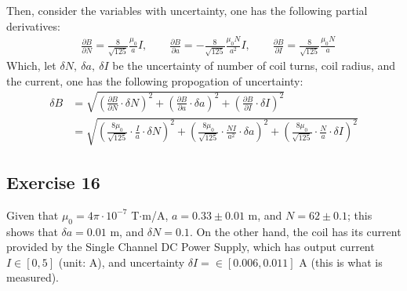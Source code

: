 \documentclass{article}
\begin{document}
Then, consider the variables with uncertainty, one has the following partial derivatives:
\begin{align}
    & \frac{\partial B}{\partial N} = \frac{8}{\sqrt{125}}\frac{\mu_0}{a}I,\quad\quad \frac{\partial B}{\partial a} = -\frac{8}{\sqrt{125}}\frac{\mu_0 N}{a^2}I,\quad\quad \frac{\partial B}{\partial I}  = \frac{8}{\sqrt{125}}\frac{\mu_0 N}{a}
\end{align}
Which, let $\delta N,\ \delta a,\ \delta I$ be the uncertainty of number of coil turns, coil radius, and the current, one has the following propogation of uncertainty:
\begin{align}
    \delta B &= \sqrt{\left(\frac{\partial B}{\partial N}\cdot \delta N\right)^2+\left(\frac{\partial B}{\partial a}\cdot \delta a\right)^2+\left(\frac{\partial B}{\partial I}\cdot \delta I\right)^2}\\
    &= \sqrt{\left(\frac{8\mu_0}{\sqrt{125}}\cdot \frac{I}{a}\cdot \delta N\right)^2 + \left(\frac{8\mu_0}{\sqrt{125}}\cdot\frac{NI}{a^2}\cdot\delta a\right)^2 + \left(\frac{8\mu_0}{\sqrt{125}}\cdot\frac{N}{a}\cdot\delta I\right)^2}
\end{align}

\hfil

\subsection{Exercise 16}

Given that $\mu_0 = 4\pi\cdot 10^{-7}$ T$\cdot$m/A, $a = 0.33 \pm 0.01$ m, and $N = 62\pm 0.1$; this shows that $\delta a = 0.01$ m, and $\delta N = 0.1$. On the other hand, the coil has its current provided by the Single Channel DC Power Supply, which has output current $I \in [0,5]$ (unit: A), and uncertainty $\delta I = \in [0.006,0.011]$ A (this is what is measured).
\end{document}
